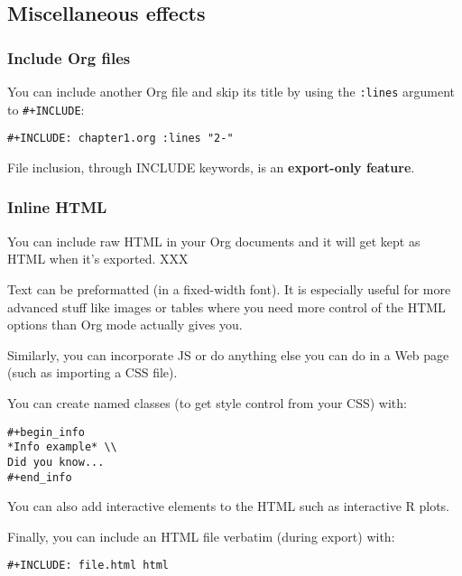 \documentclass[11pt]{article}
\begin{document}
\subsection*{Miscellaneous effects}
\label{sec:org63cc42a}

\subsubsection*{Include Org files}
\label{sec:orgd12317e}

You can include another Org file and skip its title by using the \texttt{:lines} argument
to \texttt{\#+INCLUDE}:

\begin{verbatim}
#+INCLUDE: chapter1.org :lines "2-"
\end{verbatim}

\begin{note}
File inclusion, through INCLUDE keywords, is an \textbf{export-only feature}.
\end{note}

\subsubsection*{Inline HTML}
\label{sec:orgcc336bf}

You can include raw HTML in your Org documents and it will get kept as HTML
when it's exported. XXX

Text can be preformatted (in a fixed-width font).
It is especially useful for more advanced stuff like images or tables where you
need more control of the HTML options than Org mode actually gives you.

Similarly, you can incorporate JS or do anything else you can do in a Web page
(such as importing a CSS file).

You can create named classes (to get style control from your CSS) with:

\begin{verbatim}
#+begin_info
*Info example* \\
Did you know...
#+end_info
\end{verbatim}

You can also add interactive elements to the HTML such as interactive R plots.

Finally, you can include an HTML file verbatim (during export) with:

\begin{verbatim}
#+INCLUDE: file.html html
\end{verbatim}
\end{document}
